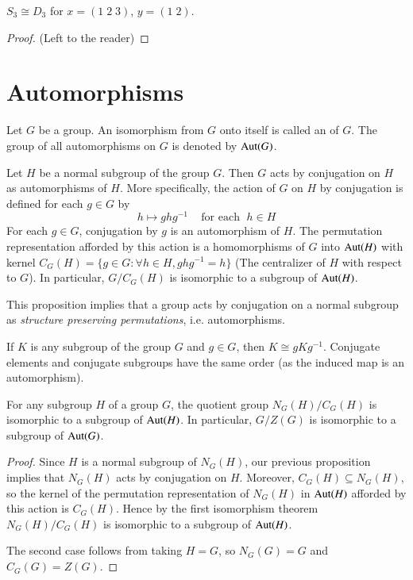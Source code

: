 \documentclass[12pt, a4paper, oneside, openright, titlepage]{book}
\begin{document}
\begin{cor}
    $S_3 \cong D_3$ for $x = (1\;2\;3)$, $y = (1\;2)$.
    \begin{proof}
        (Left to the reader)
    \end{proof}
\end{cor}



\section{\textsection Automorphisms}

\begin{defn}
    Let $G$ be a group. An isomorphism from $G$ onto itself is called an  of $G$. The group of all automorphisms on $G$ is denoted by $\operatorname{Aut}(G)$.
\end{defn}


\begin{prop}
    Let $H$ be a normal subgroup of the group $G$. Then $G$ acts by conjugation on $H$ as automorphisms of $H$. More specifically, the action of $G$ on $H$ by conjugation is defined for each $g \in G$ by \begin{equation*}
        h\mapsto ghg^{-1}\;\;\;\text{ for each }\;h\in H
    \end{equation*}
    For each $g \in G$, conjugation by $g$ is an automorphism of $H$. The permutation representation afforded by this action is a homomorphisms of $G$ into $\operatorname{Aut}(H)$ with kernel $C_G(H) = \{g \in G:\forall h\in H, ghg^{-1} =h\}$ (The centralizer of $H$ with respect to $G$). In particular, $G/C_G(H)$ is isomorphic to a subgroup of $\operatorname{Aut}(H)$.
\end{prop}

\begin{rmk}
    This proposition implies that a group acts by conjugation on a normal subgroup as \emph{structure preserving permutations}, i.e. automorphisms.
\end{rmk}

\begin{cor}
    If $K$ is any subgroup of the group $G$ and $g \in G$, then $K \cong gKg^{-1}$. Conjugate elements and conjugate subgroups have the same order (as the induced map is an automorphism).
\end{cor}


\begin{cor}
    For any subgroup $H$ of a group $G$, the quotient group $N_G(H)/C_G(H)$ is isomorphic to a subgroup of $\operatorname{Aut}(H)$. In particular, $G/Z(G)$ is isomorphic to a subgroup of $\operatorname{Aut}(G)$.
\end{cor}
\begin{proof}
    Since $H$ is a normal subgroup of $N_G(H)$, our previous proposition implies that $N_G(H)$ acts by conjugation on $H$. Moreover, $C_G(H) \subseteq N_G(H)$, so the kernel of the permutation representation of $N_G(H)$ in $\operatorname{Aut}(H)$ afforded by this action is $C_G(H)$. Hence by the first isomorphism theorem $N_G(H)/C_G(H)$ is isomorphic to a subgroup of $\operatorname{Aut}(H)$.

    The second case follows from taking $H = G$, so $N_G(G) = G$ and $C_G(G) = Z(G)$.
\end{proof}
\end{document}
